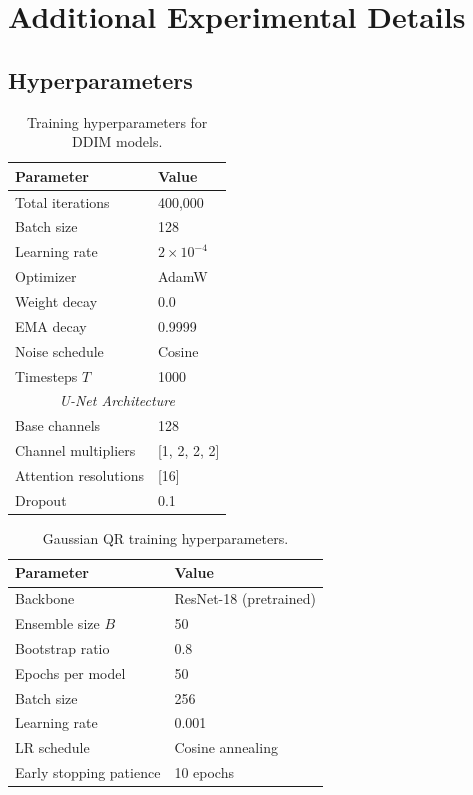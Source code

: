 \documentclass[sigconf, review, anonymous]{acmart}
\begin{document}
\appendix

\section{Additional Experimental Details}
\label{app:details}

\subsection{Hyperparameters}

\begin{table}[h]
\caption{Training hyperparameters for DDIM models.}
\begin{center}
\begin{tabular}{ll}
\toprule
Parameter & Value \\
\midrule
Total iterations & 400,000 \\
Batch size & 128 \\
Learning rate & $2 \times 10^{-4}$ \\
Optimizer & AdamW \\
Weight decay & 0.0 \\
EMA decay & 0.9999 \\
Noise schedule & Cosine \\
Timesteps $T$ & 1000 \\
\midrule
\multicolumn{2}{c}{\textit{U-Net Architecture}} \\
Base channels & 128 \\
Channel multipliers & [1, 2, 2, 2] \\
Attention resolutions & [16] \\
Dropout & 0.1 \\
\bottomrule
\end{tabular}
\end{center}
\end{table}

\begin{table}[h]
\caption{Gaussian QR training hyperparameters.}
\begin{center}
\begin{tabular}{ll}
\toprule
Parameter & Value \\
\midrule
Backbone & ResNet-18 (pretrained) \\
Ensemble size $B$ & 50 \\
Bootstrap ratio & 0.8 \\
Epochs per model & 50 \\
Batch size & 256 \\
Learning rate & 0.001 \\
LR schedule & Cosine annealing \\
Early stopping patience & 10 epochs \\
\bottomrule
\end{tabular}
\end{center}
\end{table}
\end{document}
